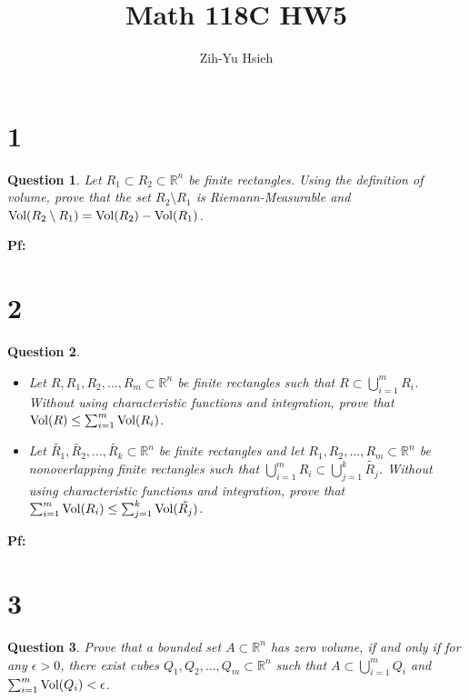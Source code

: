 \documentclass{article}
\title{Math 118C HW5}
\author{Zih-Yu Hsieh}
\newtheorem{question}{Question}
\begin{document}
\maketitle

\section*{1}
\begin{myBox}[]{}
    \begin{question}
        Let $R_1\subset R_2\subset\mathbb{R}^n$ be finite rectangles. Using the definition of volume, prove that the set $R_2\setminus R_1$ is Riemann-Measurable and $\textmd{Vol}(R_2\setminus R_1)=\textmd{Vol}(R_2)-\textmd{Vol}(R_1)$.
    \end{question}
\end{myBox}

\textbf{Pf:}

\break

\section*{2}
\begin{myBox}[]{}
    \begin{question}

        \hfil

        \begin{itemize}
            \item[1.] Let $R,R_1,R_2,...,R_m\subset \mathbb{R}^n$ be finite rectangles such that $R\subset\bigcup_{i=1}^{m}R_i$. Without using characteristic functions and integration, prove that $\textmd{Vol}(R)\leq \sum_{i=1}^{m}\textmd{Vol}(R_i)$.
            \item[2.] Let $\tilde{R_1},\tilde{R_2},...,\tilde{R_k}\subset \mathbb{R}^n$ be finite rectangles and let $R_1,R_2,...,R_m\subset\mathbb{R}^n$ be nonoverlapping finite rectangles such that $\bigcup_{i=1}^{m}R_i\subset\bigcup_{j=1}^{k}\tilde{R_j}$. Without using characteristic functions and integration, prove that $\sum_{i=1}^{m}\textmd{Vol}(R_i)\leq\sum_{j=1}^{k}\textmd{Vol}(\tilde{R_j})$. 
        \end{itemize}
    \end{question}
\end{myBox}

\textbf{Pf:}

\break

\section*{3}
\begin{myBox}[]{}
    \begin{question}
        Prove that a bounded set $A\subset\mathbb{R}^n$ has zero volume, if and only if for any $\epsilon>0$, there exist cubes $Q_1,Q_2,...,Q_m\subset\mathbb{R}^n$ such that $A\subset\bigcup_{i=1}^{m}Q_i$ and $\sum_{i=1}^{m}\textmd{Vol}(Q_i)<\epsilon$.
    \end{question}
\end{myBox}
\end{document}
